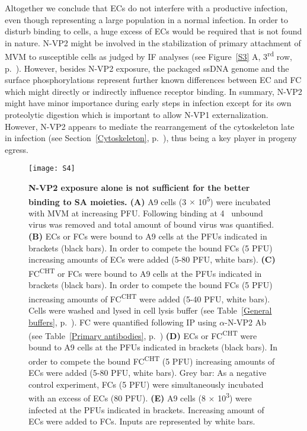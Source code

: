 Altogether we conclude that ECs do not interfere with a productive infection, even though representing a large population in a normal infection. In order to disturb binding to cells, a huge excess of ECs would be required that is not found in nature. N-VP2 might be involved in the stabilization of primary attachment of MVM to susceptible cells as judged by IF analyses (see Figure~\ref{S3} A, 3\textsuperscript{rd} row, p.~\pageref{S3}). However, besides N-VP2 exposure, the packaged ssDNA genome and the surface phosphorylations represent further known differences between EC and FC which might directly or indirectly influence receptor binding. In summary, N-VP2 might have minor importance during early steps in infection except for its own proteolytic digestion which is important to allow N-VP1 externalization. However, N-VP2 appears to mediate the rearrangement of the cytoskeleton late in infection (see Section~\ref{Cytoskeleton}, p.~\pageref{Cytoskeleton}), thus being a key player in progeny egress.        



\begin{figure}
\centering
  \texttt{[image: S4]} \\[0.3cm]
  \caption[N-VP2 Exposure Alone is not Sufficient for the Better Binding to SA Moieties]
   {\textbf{N-VP2 exposure alone is not sufficient for the better binding to SA moieties. (A)} A9 cells (3 $\times$ 10\textsuperscript{5}) were incubated with MVM at increasing PFU. Following binding at 4 \textcelsius~unbound virus was removed and total amount of bound virus was quantified. \textbf{(B)} ECs or FCs were bound to A9 cells at the PFUs indicated in brackets (black bars). In order to compete the bound FCs (5 PFU) increasing amounts of ECs were added (5-80 PFU, white bars). \textbf{(C)} FC\textsuperscript{CHT} or FCs were bound to A9 cells at the PFUs indicated in brackets (black bars). In order to compete the bound FCs (5 PFU) increasing amounts of FC\textsuperscript{CHT} were added (5-40 PFU, white bars). Cells were washed and lysed in cell lysis buffer (see Table~\ref{General buffers}, p.~\pageref{General buffers}). FC were quantified following IP using $\alpha$-N-VP2 Ab (see Table~\ref{Primary antibodies}, p.~\pageref{Primary antibodies}) \textbf{(D)} ECs or FC\textsuperscript{CHT} were bound to A9 cells at the PFUs indicated in brackets (black bars). In order to compete the bound FC\textsuperscript{CHT} (5 PFU) increasing amounts of ECs were added (5-80 PFU, white bars). Grey bar: As a negative control experiment, FCs (5 PFU) were simultaneously incubated with an excess of ECs (80 PFU). \textbf{(E)} A9 cells (8 $\times$ 10\textsuperscript{3}) were infected at the PFUs indicated in brackets. Increasing amount of ECs were added to FCs. Inputs are represented by white bars.} 
\label{S4}
\end{figure}










